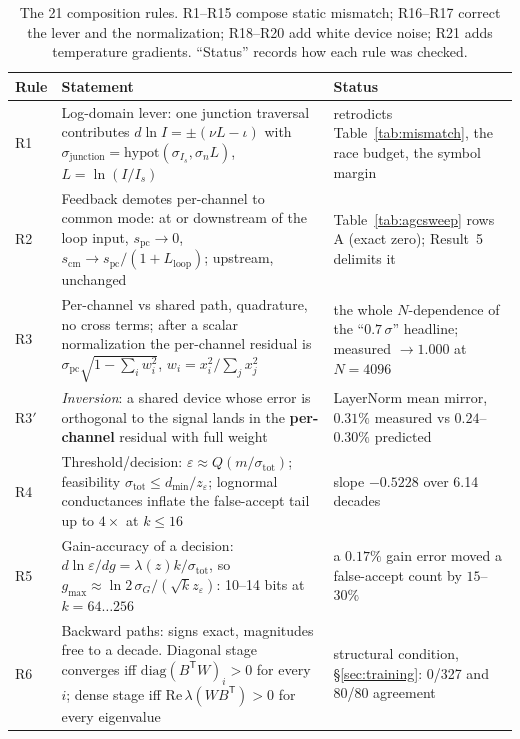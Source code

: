 \documentclass[11pt]{article}
\begin{document}
\begin{table}[t]
\centering
\caption{The 21 composition rules. R1--R15 compose static mismatch; R16--R17 correct the lever and the normalization; R18--R20 add white device noise; R21 adds temperature gradients. ``Status'' records how each rule was checked.}
\label{tab:rules}
\scriptsize
\begin{tabular}{p{0.7cm}p{9.6cm}p{4.2cm}}
\toprule
Rule & Statement & Status \\
\midrule
R1 & Log-domain lever: one junction traversal contributes $d\ln I = \pm(\nu L - \iota)$ with $\sigma_{\mathrm{junction}} = \mathrm{hypot}(\sigma_{I_s}, \sigma_n L)$, $L = \ln(I/I_s)$ & retrodicts Table~\ref{tab:mismatch}, the race budget, the symbol margin \\
R2 & Feedback demotes per-channel to common mode: at or downstream of the loop input, $s_{\mathrm{pc}}\to0$, $s_{\mathrm{cm}} \to s_{\mathrm{pc}}/(1+L_{\mathrm{loop}})$; upstream, unchanged & Table~\ref{tab:agcsweep} rows A (exact zero); Result~5 delimits it \\
R3 & Per-channel vs shared path, quadrature, no cross terms; after a scalar normalization the per-channel residual is $\sigma_{\mathrm{pc}}\sqrt{1-\sum_i w_i^2}$, $w_i = x_i^2/\sum_j x_j^2$ & the whole $N$-dependence of the ``$0.7\,\sigma$'' headline; measured $\to 1.000$ at $N=4096$ \\
R3$'$ & \textit{Inversion}: a shared device whose error is orthogonal to the signal lands in the \textbf{per-channel} residual with full weight & LayerNorm mean mirror, $0.31\%$ measured vs $0.24$--$0.30\%$ predicted \\
R4 & Threshold/decision: $\varepsilon \approx Q(m/\sigma_{\mathrm{tot}})$; feasibility $\sigma_{\mathrm{tot}} \le d_{\min}/z_\varepsilon$; lognormal conductances inflate the false-accept tail up to $4\times$ at $k \le 16$ & slope $-0.5228$ over 6.14 decades \\
R5 & Gain-accuracy of a decision: $d\ln\varepsilon/dg = \lambda(z)k/\sigma_{\mathrm{tot}}$, so $g_{\max} \approx \ln2\,\sigma_G/(\sqrt k z_\varepsilon)$: 10--14 bits at $k = 64\ldots256$ & a $0.17\%$ gain error moved a false-accept count by $15$--$30\%$ \\
R6 & Backward paths: signs exact, magnitudes free to a decade. Diagonal stage converges iff $\mathrm{diag}(B^{\mathsf T}W)_i > 0$ for every $i$; dense stage iff $\mathrm{Re}\,\lambda(WB^{\mathsf T}) > 0$ for every eigenvalue & structural condition, \S\ref{sec:training}: 0/327 and 80/80 agreement \\

\end{tabular}
\end{table}
\end{document}
